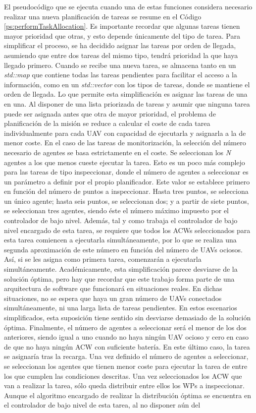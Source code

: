 \documentclass[fontsize=11pt, English=false, Español=true, Myfinal=true, twoside, numbers=noenddot]{scrbook}
\begin{document}
El pseudocódigo que se ejecuta cuando una de estas funciones considera necesario realizar una nueva planificación de tareas se resume en el Código \ref{ps:performTaskAllocation}. Es importante recordar que algunas tareas tienen mayor prioridad que otras, y esto depende únicamente del tipo de tarea. Para simplificar el proceso, se ha decidido asignar las tareas por orden de llegada, asumiendo que entre dos tareas del mismo tipo, tendrá prioridad la que haya llegado primero. Cuando se recibe una nueva tarea, se almacena tanto en un \emph{std::map} que contiene todas las tareas pendientes para facilitar el acceso a la información, como en un \emph{std::vector} con los tipos de tareas, donde se mantiene el orden de llegada. Lo que permite esta simplificación es asignar las tareas de una en una. Al disponer de una lista priorizada de tareas y asumir que ninguna tarea puede ser asignada antes que otra de mayor prioridad, el problema de planificación de la misión se reduce a calcular el coste de cada tarea individualmente para cada \gls{UAV} con capacidad de ejecutarla y asignarla a la de menor coste. En el caso de las tareas de monitorización, la selección del número necesario de agentes se basa estrictamente en el coste. Se seleccionan los \emph{N} agentes a los que menos cueste ejecutar la tarea. Esto es un poco más complejo para las tareas de tipo inspeccionar, donde el número de agentes a seleccionar es un parámetro a definir por el propio planificador. Este valor se establece primero en función del número de puntos a inspeccionar. Hasta tres puntos, se selecciona un único agente; hasta seis puntos, se seleccionan dos; y a partir de siete puntos, se seleccionan tres agentes, siendo éste el número máximo impuesto por el controlador de bajo nivel. Además, tal y como trabaja el controlador de bajo nivel encargado de esta tarea, se requiere que todos los \glspl{ACW} seleccionados para esta tarea comiencen a ejecutarla simultáneamente, por lo que se realiza una segunda aproximación de este número en función del número de \glspl{UAV} ociosos. Así, si se les asigna como primera tarea, comenzarán a ejecutarla simultáneamente. Académicamente, esta simplificación parece desviarse de la solución óptima, pero hay que recordar que este trabajo forma parte de una arquitectura de software que funcionará en situaciones reales. En dichas situaciones, no se espera que haya un gran número de \glspl{UAV} conectados simultáneamente, ni una larga lista de tareas pendientes. En estos escenarios simplificados, esta suposición tiene sentido sin desviarse demasiado de la solución óptima. Finalmente, el número de agentes a seleccionar será el menor de los dos anteriores, siendo igual a uno cuando no haya ningún \gls{UAV} ocioso y cero en caso de que no haya ningún \gls{ACW} con suficiente batería. En este último caso, la tarea se asignaría tras la recarga. Una vez definido el número de agentes a seleccionar, se seleccionan los agentes que tienen menor coste para ejecutar la tarea de entre los que cumplen las condiciones descritas. Una vez seleccionados los \gls{ACW} que van a realizar la tarea, sólo queda distribuir entre ellos los \glspl{WP} a inspeccionar. Aunque el algoritmo encargado de realizar la distribución óptima se encuentra en el controlador de bajo nivel de esta tarea, al no disponer aún del 
\end{document}

